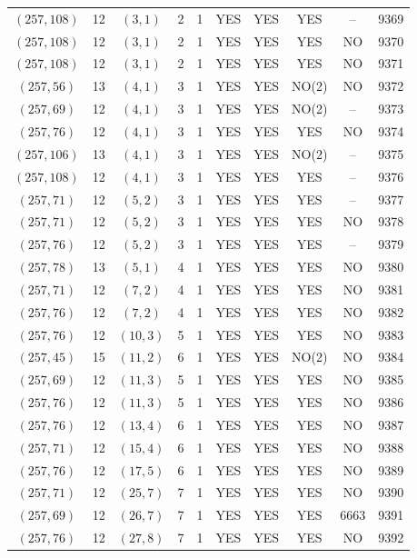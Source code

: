 \begin{longtable}{|c|c|c|c|c|c|c|c|c|c|}
$(257, 108)$ & 12 & $(3, 1)$ & 2 & 1 & YES & YES & YES & -- & 9369\\
$(257, 108)$ & 12 & $(3, 1)$ & 2 & 1 & YES & YES & YES & NO & 9370\\
$(257, 108)$ & 12 & $(3, 1)$ & 2 & 1 & YES & YES & YES & NO & 9371\\
$(257, 56)$ & 13 & $(4, 1)$ & 3 & 1 & YES & YES & NO(2) & NO & 9372\\
$(257, 69)$ & 12 & $(4, 1)$ & 3 & 1 & YES & YES & NO(2) & -- & 9373\\
$(257, 76)$ & 12 & $(4, 1)$ & 3 & 1 & YES & YES & YES & NO & 9374\\
$(257, 106)$ & 13 & $(4, 1)$ & 3 & 1 & YES & YES & NO(2) & -- & 9375\\
$(257, 108)$ & 12 & $(4, 1)$ & 3 & 1 & YES & YES & YES & -- & 9376\\
$(257, 71)$ & 12 & $(5, 2)$ & 3 & 1 & YES & YES & YES & -- & 9377\\
$(257, 71)$ & 12 & $(5, 2)$ & 3 & 1 & YES & YES & YES & NO & 9378\\
$(257, 76)$ & 12 & $(5, 2)$ & 3 & 1 & YES & YES & YES & -- & 9379\\
$(257, 78)$ & 13 & $(5, 1)$ & 4 & 1 & YES & YES & YES & NO & 9380\\
$(257, 71)$ & 12 & $(7, 2)$ & 4 & 1 & YES & YES & YES & NO & 9381\\
$(257, 76)$ & 12 & $(7, 2)$ & 4 & 1 & YES & YES & YES & NO & 9382\\
$(257, 76)$ & 12 & $(10, 3)$ & 5 & 1 & YES & YES & YES & NO & 9383\\
$(257, 45)$ & 15 & $(11, 2)$ & 6 & 1 & YES & YES & NO(2) & NO & 9384\\
$(257, 69)$ & 12 & $(11, 3)$ & 5 & 1 & YES & YES & YES & NO & 9385\\
$(257, 76)$ & 12 & $(11, 3)$ & 5 & 1 & YES & YES & YES & NO & 9386\\
$(257, 76)$ & 12 & $(13, 4)$ & 6 & 1 & YES & YES & YES & NO & 9387\\
$(257, 71)$ & 12 & $(15, 4)$ & 6 & 1 & YES & YES & YES & NO & 9388\\
$(257, 76)$ & 12 & $(17, 5)$ & 6 & 1 & YES & YES & YES & NO & 9389\\
$(257, 71)$ & 12 & $(25, 7)$ & 7 & 1 & YES & YES & YES & NO & 9390\\
$(257, 69)$ & 12 & $(26, 7)$ & 7 & 1 & YES & YES & YES & 6663 & 9391\\
$(257, 76)$ & 12 & $(27, 8)$ & 7 & 1 & YES & YES & YES & NO & 9392\\

\end{longtable}
